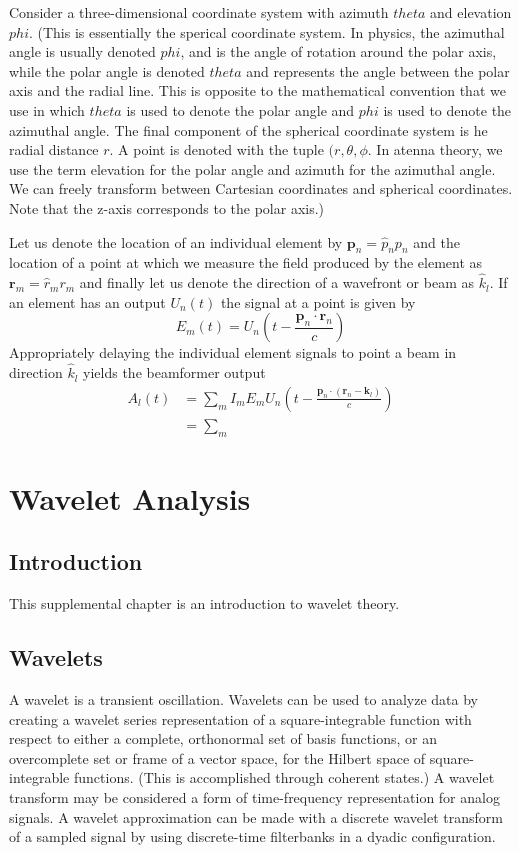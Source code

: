 \documentclass[11pt]{report}
\theoremstyle{example}
\begin{document}
Consider a three-dimensional coordinate system with azimuth $theta$ and elevation $phi$. (This is essentially the sperical coordinate system. In physics, the azimuthal angle is usually denoted $phi$, and is the angle of rotation around the polar axis, while the polar angle is denoted $theta$ and represents the angle between the polar axis and the radial line. This is opposite to the mathematical convention that we use in which $theta$ is used to denote the polar angle and $phi$ is used to denote the azimuthal angle. The final component of the spherical coordinate system is he radial distance $r$. A point is denoted with the tuple $(r,\theta,\phi$. In atenna theory, we use the term elevation for the polar angle and azimuth for the azimuthal angle. We can freely transform between Cartesian coordinates and spherical coordinates. Note that the z-axis corresponds to the polar axis.)

Let us denote the location of an individual element by $\mathbf{p}_n=\hat{p}_np_n$ and the location of a point at which we measure the field produced by the element as $\mathbf{r}_m=\hat{r}_mr_m$ and finally let us denote the direction of a wavefront or beam as $\hat{k}_l$. If an element has an output $U_n(t)$ the signal at a point is given by
\begin{equation}
	E_m(t)=U_n\left(t-\frac{\mathbf{p}_n\cdot\mathbf{r}_n}{c}\right)
\end{equation}
Appropriately delaying the individual element signals to point a beam in direction $\hat{k}_l$ yields the beamformer output
\begin{equation}
	\begin{split}
		A_l(t)&=\sum_m{I_mE_mU_n\left(t-\frac{\mathbf{p}_n\cdot(\mathbf{r}_n-\mathbf{k}_l)}{c}\right)}\\
		&=\sum_m{}
	\end{split}
\end{equation}

\chapter{Wavelet Analysis}
\section{Introduction}
This supplemental chapter is an introduction to wavelet theory.

\section{Wavelets}
A wavelet is a transient oscillation. Wavelets can be used to analyze data by creating a wavelet series representation of a square-integrable function with respect to either a complete, orthonormal set of basis functions, or an overcomplete set or frame of a vector space, for the Hilbert space of square-integrable functions. (This is accomplished through coherent states.) 
A wavelet transform may be considered a form of time-frequency representation for analog signals. A wavelet approximation can be made with a discrete wavelet transform of a sampled signal by using discrete-time filterbanks in a dyadic configuration.
\end{document}
